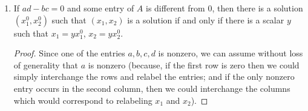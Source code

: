 \begin{enumerate}
\begin{proof}
    On the other hand, if $bd = 0$ then one of $b$ or $d$ is zero (but
    not both). If $b = 0$, then $ad\neq0$ and we get
    \begin{gather*}
      \begin{bmatrix}
        a & 0 \\
        c & d
      \end{bmatrix}
      \xrightarrow{(1)}
      \begin{bmatrix}
        1 & 0 \\
        c & d
      \end{bmatrix}
      \xrightarrow{(2)}
      \begin{bmatrix}
        1 & 0 \\
        0 & d
      \end{bmatrix}
      \xrightarrow{(1)}
      \begin{bmatrix}
        1 & 0 \\
        0 & 1
      \end{bmatrix}.
    \end{gather*}
    If $d = 0$, then $bc\neq0$ and we have
    \begin{gather*}
      \begin{bmatrix}
        a & b \\
        c & 0
      \end{bmatrix}
      \xrightarrow{(3)}
      \begin{bmatrix}
        c & 0 \\
        a & b
      \end{bmatrix}
      \xrightarrow{(1)}
      \begin{bmatrix}
        1 & 0 \\
        a & b
      \end{bmatrix}
      \xrightarrow{(2)}
      \begin{bmatrix}
        1 & 0 \\
        0 & b
      \end{bmatrix}
      \xrightarrow{(1)}
      \begin{bmatrix}
        1 & 0 \\
        0 & 1
      \end{bmatrix}.
    \end{gather*}

    We see that, in every case, $A$ is row-equivalent to the identity
    matrix. Therefore $AX = 0$ has only the trivial solution.
  \end{proof}
\item If $ad - bc = 0$ and some entry of $A$ is different from $0$,
  then there is a solution $(x_1^0, x_2^0)$ such that $(x_1,x_2)$ is a
  solution if and only if there is a scalar $y$ such that
  $x_1 = yx_1^0$, $x_2 = yx_2^0$.
  \begin{proof}
    Since one of the entries $a,b,c,d$ is nonzero, we can assume
    without loss of generality that $a$ is nonzero (because, if the
    first row is zero then we could simply interchange the rows and
    relabel the entries; and if the only nonzero entry occurs in the
    second column, then we could interchange the columns which would
    correspond to relabeling $x_1$ and $x_2$).


\end{proof}
\end{enumerate}
